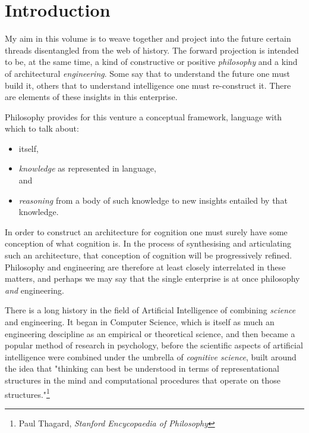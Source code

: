 

\chapter{Introduction}\label{Introduction}

My aim in this volume is to weave together and project into the future certain threads disentangled from the web of history.
The forward projection is intended to be, at the same time, a kind of constructive or positive {\it philosophy} and a kind of architectural {\it engineering}.
Some say that to understand the future one must build it, others that to understand intelligence one must re-construct it.
There are elements of these insights in this enterprise.

Philosophy provides for this venture a conceptual framework, language with which to talk about:
\begin{itemize}
\item {} itself,
\item {\it knowledge} as represented in language,\\
  and
\item {\it reasoning} from a body of such knowledge to new insights entailed by that knowledge.
\end{itemize}

In order to construct an architecture for cognition one must surely have some conception of what cognition is.
In the process of synthesising and articulating such an architecture, that conception of cognition will be progressively refined.
Philosophy and engineering are therefore at least closely interrelated in these matters, and perhaps we may say that the single enterprise is at once philosophy {\it and} engineering.

There is a long history in the field of Artificial Intelligence of combining {\it science} and engineering.
It began in Computer Science, which is itself as much an engineering descipline as an empirical or theoretical science, and then became a popular method of research in psychology, before the scientific aspects of artificial intelligence were combined under the umbrella of {\it cognitive science}, built around the idea that "thinking can best be understood in terms of representational structures in the mind and computational procedures that operate on those structures."\footnote{Paul Thagard, \it Stanford Encycopaedia of Philosophy}

